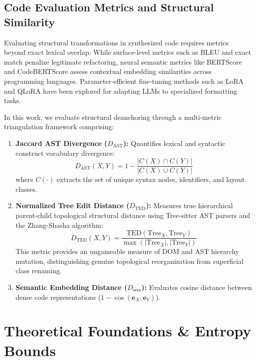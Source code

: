 \documentclass[10pt,journal,compsoc]{IEEEtran}
\begin{document}
\subsection{Code Evaluation Metrics and Structural Similarity}
Evaluating structural transformations in synthesized code requires metrics beyond exact lexical overlap. While surface-level metrics such as BLEU and exact match penalize legitimate refactoring, neural semantic metrics like BERTScore \cite{zhang2020bertscore} and CodeBERTScore \cite{zhou2023codebertscore} assess contextual embedding similarities across programming languages. Parameter-efficient fine-tuning methods such as LoRA \cite{hu2021lora} and QLoRA \cite{dettmers2023qlora} have been explored for adapting LLMs to specialized formatting tasks. 

In this work, we evaluate structural deanchoring through a multi-metric triangulation framework comprising:
\begin{enumerate}
    \item \textbf{Jaccard AST Divergence ($D_{\text{AST}}$):} Quantifies lexical and syntactic construct vocabulary divergence:
    \begin{equation}
    D_{\text{AST}}(X, Y) = 1 - \frac{|C(X) \cap C(Y)|}{|C(X) \cup C(Y)|}
    \end{equation}
    where $C(\cdot)$ extracts the set of unique syntax nodes, identifiers, and layout classes.
    \item \textbf{Normalized Tree Edit Distance ($D_{\text{TED}}$):} Measures true hierarchical parent-child topological structural distance using Tree-sitter AST parsers and the Zhang-Shasha algorithm:
    \begin{equation}
    D_{\text{TED}}(X, Y) = \frac{\text{TED}(\text{Tree}_X, \text{Tree}_Y)}{\max(|\text{Tree}_X|, |\text{Tree}_Y|)}
    \end{equation}
    This metric provides an ungameable measure of DOM and AST hierarchy mutation, distinguishing genuine topological reorganization from superficial class renaming.
    \item \textbf{Semantic Embedding Distance ($D_{\text{sem}}$):} Evaluates cosine distance between dense code representations ($1 - \cos(\mathbf{e}_X, \mathbf{e}_Y)$).
\end{enumerate}

\section{Theoretical Foundations \& Entropy Bounds}
\end{document}
